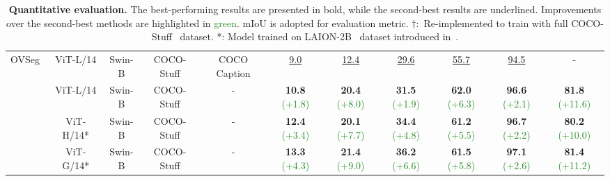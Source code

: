\documentclass[10pt,twocolumn,letterpaper]{article}
\newcommand{\hlrow}{\rowcolor{black!6}}
\newcommand{\ours}{CAT-Seg\xspace}
\begin{document}
\begin{table*}[!t]
\begin{center}
{\begin{tabular}{l|cccc|cccccc}
        OVSeg~\cite{liang2022open} & ViT-L/14 & Swin-B & COCO-Stuff & COCO Caption & \underline{9.0} & \underline{12.4} & \underline{29.6} & \underline{55.7} & \underline{94.5} & - \\
        \hlrow 
        & ViT-L/14 & Swin-B & COCO-Stuff & -& \textbf{10.8} \textcolor{ForestGreen}{(+1.8)} & \textbf{20.4} \textcolor{ForestGreen}{(+8.0)} & \textbf{31.5} \textcolor{ForestGreen}{(+1.9)} & \textbf{62.0} \textcolor{ForestGreen}{(+6.3)} & \textbf{96.6} \textcolor{ForestGreen}{(+2.1)} & \textbf{81.8} \textcolor{ForestGreen}{(+11.6)}\\
        \hlrow & ViT-H/14* & Swin-B & COCO-Stuff & - & \textbf{12.4} \textcolor{ForestGreen}{(+3.4)} & \textbf{20.1} \textcolor{ForestGreen}{(+7.7)} & \textbf{34.4} \textcolor{ForestGreen}{(+4.8)} & \textbf{61.2} \textcolor{ForestGreen}{(+5.5)} & \textbf{96.7} \textcolor{ForestGreen}{(+2.2)} & \textbf{80.2} \textcolor{ForestGreen}{(+10.0)}\\

        \hlrow \multirow{-3}{*}{\ours (ours)} & ViT-G/14* & Swin-B & COCO-Stuff & - & \textbf{13.3} \textcolor{ForestGreen}{(+4.3)} & \textbf{21.4} \textcolor{ForestGreen}{(+9.0)} & \textbf{36.2} \textcolor{ForestGreen}{(+6.6)} & \textbf{61.5} \textcolor{ForestGreen}{(+5.8)} & \textbf{97.1} \textcolor{ForestGreen}{(+2.6)} & \textbf{81.4} \textcolor{ForestGreen}{(+11.2)}\\
        \bottomrule
    \end{tabular}
    }
    \vspace{-5pt}
    \caption{\textbf{Quantitative evaluation.} The best-performing results are presented in bold, while the second-best results are underlined. Improvements over the second-best methods are highlighted in \textcolor{ForestGreen}{green}. mIoU is adopted for evaluation metric. $\dagger$:~Re-implemented to train with full COCO-Stuff~\cite{caesar2018coco} dataset. *: Model trained on LAION-2B~\cite{schuhmann2022laion} dataset introduced in~\cite{cherti2022reproducible}.
    }\label{tab:main_table}
    \end{center}\vspace{-5pt}
\end{table*}
 
\end{document}
